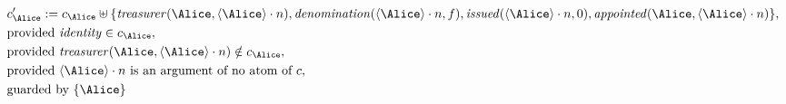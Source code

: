 \begin{align*}
&
c'_
{
\Alice
}
 := 
c_
{
\Alice
}
 \uplus 
\{
\mathit{
treasurer
}
(
\Alice
,
\langle
\Alice
\rangle
\cdot
n
)
,
\mathit{
denomination
}
(
\langle
\Alice
\rangle
\cdot
n
,
f
)
,
\mathit{
issued
}
(
\langle
\Alice
\rangle
\cdot
n
,
0
)
,
\mathit{
appointed
}
(
\Alice
,
\langle
\Alice
\rangle
\cdot
n
)
\}
,\\
&
\text{provided } 
\mathit{
identity
}
 \in c_
{
\Alice
}
,\\
&
\text{provided } 
\mathit{
treasurer
}
(
\Alice
,
\langle
\Alice
\rangle
\cdot
n
)
 \notin c_
{
\Alice
}
,\\
&
\text{provided } 
\langle
\Alice
\rangle
\cdot
n
 \text{ is an argument of no atom of } c
,\\
&
\text{guarded by } \{
\Alice
\}
\end{align*}

